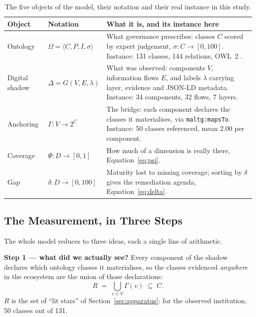 \documentclass[engproc,article,submit,moreauthors]{Definitions/mdpi}
\begin{document}
\begin{table}[H]
\small
\caption{The five objects of the model, their notation and their real instance in this study.\label{tab:objects}}
\begin{tabularx}{\textwidth}{llX}
\toprule
\textbf{Object} & \textbf{Notation} & \textbf{What it is, and its instance here}\\
\midrule
Ontology & $\Omega=\langle C,P,I,\sigma\rangle$ & What governance prescribes: classes $C$ scored by expert judgement, $\sigma:C\to[0,100]$. Instance: 131 classes, 144 relations, OWL~2 \cite{Gruber1993,Uschold1996,Guarino2002}.\\
Digital shadow & $\Delta=G(V,E,\lambda)$ & What was observed: components $V$, information flows $E$, and labels $\lambda$ carrying layer, evidence and JSON-LD metadata. Instance: 34 components, 32 flows, 7 layers.\\
Anchoring & $\Gamma:V\to 2^{C}$ & The bridge: each component declares the classes it materialises, via \texttt{maltg:mapsTo}. Instance: 50 classes referenced, mean 2.00 per component.\\
Coverage & $\Psi:D\to[0,1]$ & How much of a dimension is really there, Equation~\eqref{eq:psi}.\\
Gap & $\delta:D\to[0,100]$ & Maturity lost to missing coverage; sorting by $\delta$ gives the remediation agenda, Equation~\eqref{eq:delta}.\\
\bottomrule
\end{tabularx}
\end{table}

\subsection{The Measurement, in Three Steps}
The whole model reduces to three ideas, each a single line of arithmetic.

\textbf{Step 1 --- what did we actually see?} Every component of the shadow declares which ontology classes it materialises, so the classes evidenced \emph{anywhere} in the ecosystem are the union of those declarations:
\begin{equation}
R \;=\; \bigcup_{v \in V} \Gamma(v) \;\subseteq\; C .
\label{eq:coverage-set}
\end{equation}
$R$ is the set of ``lit stars'' of Section~\ref{sec:apparatus}: for the observed institution, 50 classes out of 131.
\end{document}
